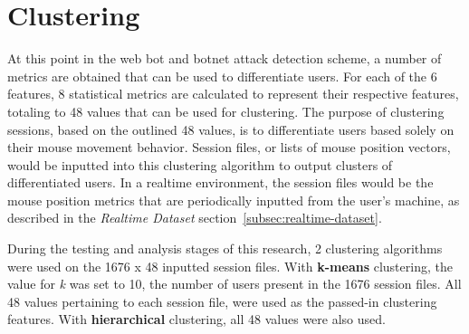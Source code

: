 
\section{Clustering}\label{sec:clustering}
At this point in the web bot and botnet attack detection scheme, a number of metrics are obtained that can be used to differentiate users.
For each of the 6 features, 8 statistical metrics are calculated to represent their respective features, totaling to 48 values that can be used for clustering.
The purpose of clustering sessions, based on the outlined 48 values, is to differentiate users based solely on their mouse movement behavior.
Session files, or lists of mouse position vectors, would be inputted into this clustering algorithm to output clusters of differentiated users.
In a realtime environment, the session files would be the mouse position metrics that are periodically inputted from the user's machine, as described in the \textit{Realtime Dataset} section~\ref{subsec:realtime-dataset}.

During the testing and analysis stages of this research, 2 clustering algorithms were used on the 1676 x 48 inputted session files.
With \textbf{k-means} clustering, the value for \textit{k} was set to 10, the number of users present in the 1676 session files. All 48 values pertaining to each session file, were used as the passed-in clustering features.
With \textbf{hierarchical} clustering, all 48 values were also used.
